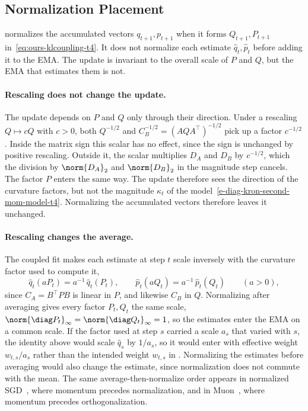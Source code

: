 \subsection{Normalization Placement}
\label{sec:scale-placement-t4}
\methodname{} normalizes the accumulated vectors $q_{t+1},p_{t+1}$ when it
forms $Q_{t+1},P_{t+1}$ in~\eqref{eq:ours-klcoupling-t4}. It does not
normalize each estimate $\hat{q}_t,\hat{p}_t$ before adding it to the EMA.
The update is invariant to the overall scale of $P$ and $Q$, but the EMA
that estimates them is not.

\paragraph{Rescaling does not change the update.} The update depends on
$P$ and $Q$ only through their direction. Under a rescaling $Q\mapsto cQ$ with
$c>0$, both $Q^{-1/2}$ and $C_B^{-1/2}=(AQA^\top)^{-1/2}$ pick up a factor
$c^{-1/2}$. Inside the matrix sign this scalar has no effect, since the sign
is unchanged by positive rescaling. Outside it, the scalar multiplies $D_A$
and $D_B$ by $c^{-1/2}$, which the division by $\norm{D_A}_2$ and
$\norm{D_B}_2$ in the magnitude step cancels. The factor $P$ enters the same
way. The update therefore sees the direction of the curvature factors, but
not the magnitude $\kappa_t$ of the
model~\eqref{e-diag-kron-second-mom-model-t4}. Normalizing the accumulated
vectors therefore leaves it unchanged.

\paragraph{Rescaling changes the average.} The coupled fit makes each
estimate at step $t$ scale inversely with the curvature factor used to compute it,
\[
  \hat{q}_t(aP_t)=a^{-1}\,\hat{q}_t(P_t),
  \qquad
  \hat{p}_t(aQ_t)=a^{-1}\,\hat{p}_t(Q_t)
  \qquad(a>0),
\]
since $C_A=B^\top PB$ is linear in $P$, and likewise $C_B$ in $Q$.
Normalizing after averaging gives every factor $P_t,Q_t$ the same scale,
$\norm{\diag P_t}_\infty=\norm{\diag Q_t}_\infty=1$, so the estimates enter
the EMA on a common scale. If the factor used at step $s$
carried a scale $a_s$ that varied with $s$, the identity above would scale
$\hat{q}_s$ by $1/a_s$, so it would enter with effective weight
$w_{t,s}/a_s$ rather than the intended weight $w_{t,s}$ in
. Normalizing the estimates before
averaging would also change the estimate, since normalization does not
commute with the mean. The same average-then-normalize order appears in
normalized SGD~\cite{cutkosky_nigt}, where momentum precedes normalization,
and in Muon~\cite{denoise_ortho}, where momentum precedes orthogonalization.
